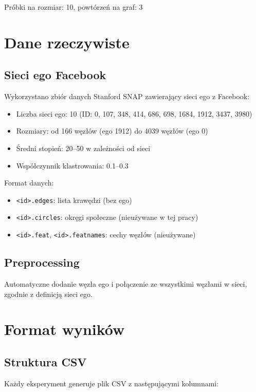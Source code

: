Próbki na rozmiar: 10, powtórzeń na graf: 3

\section{Dane rzeczywiste}

\subsection{Sieci ego Facebook}

Wykorzystano zbiór danych Stanford SNAP zawierający sieci ego z Facebook:

\begin{itemize}
\item Liczba sieci ego: 10 (ID: 0, 107, 348, 414, 686, 698, 1684, 1912, 3437, 3980)
\item Rozmiary: od 166 węzłów (ego 1912) do 4039 węzłów (ego 0)
\item Średni stopień: 20--50 w zależności od sieci
\item Współczynnik klastrowania: 0.1--0.3
\end{itemize}

Format danych:
\begin{itemize}
\item \texttt{<id>.edges}: lista krawędzi (bez ego)
\item \texttt{<id>.circles}: okręgi społeczne (nieużywane w tej pracy)
\item \texttt{<id>.feat}, \texttt{<id>.featnames}: cechy węzłów (nieużywane)
\end{itemize}

\subsection{Preprocessing}

Automatyczne dodanie węzła ego i połączenie ze wszystkimi węzłami w sieci, zgodnie z definicją sieci ego.

\section{Format wyników}

\subsection{Struktura CSV}

Każdy eksperyment generuje plik CSV z następującymi kolumnami:

